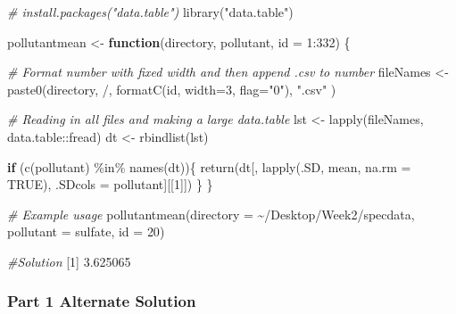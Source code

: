 \documentclass[
]{article}
\newenvironment{Shaded}{\begin{snugshade}}{\end{snugshade}}
\newcommand{\AttributeTok}[1]{\textcolor[rgb]{0.77,0.63,0.00}{#1}}
\newcommand{\CommentTok}[1]{\textcolor[rgb]{0.56,0.35,0.01}{\textit{#1}}}
\newcommand{\ConstantTok}[1]{\textcolor[rgb]{0.00,0.00,0.00}{#1}}
\newcommand{\ControlFlowTok}[1]{\textcolor[rgb]{0.13,0.29,0.53}{\textbf{#1}}}
\newcommand{\DecValTok}[1]{\textcolor[rgb]{0.00,0.00,0.81}{#1}}
\newcommand{\FloatTok}[1]{\textcolor[rgb]{0.00,0.00,0.81}{#1}}
\newcommand{\FunctionTok}[1]{\textcolor[rgb]{0.00,0.00,0.00}{#1}}
\newcommand{\NormalTok}[1]{#1}
\newcommand{\OtherTok}[1]{\textcolor[rgb]{0.56,0.35,0.01}{#1}}
\newcommand{\SpecialCharTok}[1]{\textcolor[rgb]{0.00,0.00,0.00}{#1}}
\newcommand{\StringTok}[1]{\textcolor[rgb]{0.31,0.60,0.02}{#1}}
\begin{document}
\begin{Shaded}
\begin{Highlighting}[]
\CommentTok{\# install.packages("data.table")}
\FunctionTok{library}\NormalTok{(}\StringTok{"data.table"}\NormalTok{)}

\NormalTok{pollutantmean }\OtherTok{\textless{}{-}} \ControlFlowTok{function}\NormalTok{(directory, pollutant, }\AttributeTok{id =} \DecValTok{1}\SpecialCharTok{:}\DecValTok{332}\NormalTok{) \{}
  
  \CommentTok{\# Format number with fixed width and then append .csv to number}
\NormalTok{  fileNames }\OtherTok{\textless{}{-}} \FunctionTok{paste0}\NormalTok{(directory, }\StringTok{\textquotesingle{}/\textquotesingle{}}\NormalTok{, }\FunctionTok{formatC}\NormalTok{(id, }\AttributeTok{width=}\DecValTok{3}\NormalTok{, }\AttributeTok{flag=}\StringTok{"0"}\NormalTok{), }\StringTok{".csv"}\NormalTok{ )}
  
  \CommentTok{\# Reading in all files and making a large data.table}
\NormalTok{  lst }\OtherTok{\textless{}{-}} \FunctionTok{lapply}\NormalTok{(fileNames, data.table}\SpecialCharTok{::}\NormalTok{fread)}
\NormalTok{  dt }\OtherTok{\textless{}{-}} \FunctionTok{rbindlist}\NormalTok{(lst)}
  
  \ControlFlowTok{if}\NormalTok{ (}\FunctionTok{c}\NormalTok{(pollutant) }\SpecialCharTok{\%in\%} \FunctionTok{names}\NormalTok{(dt))\{}
    \FunctionTok{return}\NormalTok{(dt[, }\FunctionTok{lapply}\NormalTok{(.SD, mean, }\AttributeTok{na.rm =} \ConstantTok{TRUE}\NormalTok{), }\AttributeTok{.SDcols =}\NormalTok{ pollutant][[}\DecValTok{1}\NormalTok{]])}
\NormalTok{  \} }
\NormalTok{\}}

\CommentTok{\# Example usage}
\FunctionTok{pollutantmean}\NormalTok{(}\AttributeTok{directory =} \StringTok{\textquotesingle{}\textasciitilde{}/Desktop/Week2/specdata\textquotesingle{}}\NormalTok{, }\AttributeTok{pollutant =} \StringTok{\textquotesingle{}sulfate\textquotesingle{}}\NormalTok{, }\AttributeTok{id =} \DecValTok{20}\NormalTok{)}

\CommentTok{\#Solution}
\NormalTok{[}\DecValTok{1}\NormalTok{] }\FloatTok{3.625065}
\end{Highlighting}
\end{Shaded}

\hypertarget{part-1-alternate-solution}{%
\subsubsection{Part 1 Alternate
Solution}\label{part-1-alternate-solution}}
\end{document}
